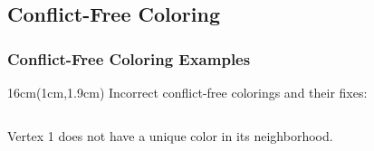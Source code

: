 \documentclass[xcolor=dvipsnames,aspectratio=1610]{beamer}
\newcommand{\exampleheight}{1.9cm}
\newcommand{\examplewidth}{16cm}
\begin{document}
\begin{frame}
  \end{frame}

  \subsection{Conflict-Free Coloring}

  \begin{frame}
    \frametitle{Conflict-Free Coloring Examples}

    \begin{textblock*}{\examplewidth}(1cm,\exampleheight) %
      Incorrect conflict-free colorings and their fixes:
    \end{textblock*}

    \vspace{0.5cm}

    \pause

    \begin{columns}
      \begin{column}{0.33333\textwidth}


        \centering
        Vertex 1 does not have a unique color in its neighborhood.
      \end{column}

      \pause
      \pause

      \begin{column}{0.33333\textwidth}


\end{column}
\end{columns}
\end{frame}
\end{document}
